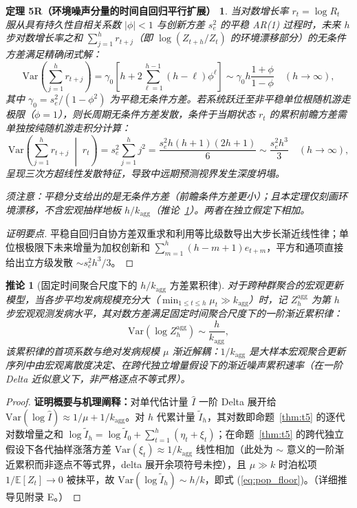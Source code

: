\documentclass[10pt,a4paper]{article}
\theoremstyle{plain}
\newtheorem*{theorem5R}{定理 5R（环境噪声分量的时间自回归平行扩展）}
\newtheorem{corollary}{推论}
\theoremstyle{definition}
\begin{document}
\begin{theorem5R}\label{thm:t5r}
当对数增长率 $r_t = \log R_t$ 服从具有持久性自相关系数 $|\phi| < 1$ 与创新方差 $s_e^2$ 的平稳 AR(1) 过程时，未来 $h$ 步对数增长率之和 $\sum_{j=1}^h r_{t+j}$（即 $\log(Z_{t+h}/Z_t)$ 的环境漂移部分）的无条件方差满足精确闭式解：
\begin{equation}
\text{Var}\left(\sum_{j=1}^h r_{t+j}\right) = \gamma_0 \left[ h + 2 \sum_{\ell=1}^{h-1} (h-\ell) \phi^\ell \right] \sim \gamma_0 h \frac{1+\phi}{1-\phi} \quad (h \to \infty),
\end{equation}
其中 $\gamma_0 = s_e^2/(1-\phi^2)$ 为平稳无条件方差。若系统跃迁至非平稳单位根随机游走极限（$\phi = 1$），则长周期无条件方差发散，条件于当期状态 $r_t$ 的累积前瞻方差需单独按纯随机游走积分计算：
\begin{equation}
\text{Var}\left(\sum_{j=1}^h r_{t+j} \;\middle|\; r_t\right) = s_e^2 \sum_{j=1}^h j^2 = \frac{s_e^2 h(h+1)(2h+1)}{6} \sim \frac{s_e^2 h^3}{3} \quad (h \to \infty),
\end{equation}
呈现三次方超线性发散特征，导致中远期预测视界发生深度坍塌。

须注意：平稳分支给出的是无条件方差（前瞻条件方差更小）；且本定理仅刻画环境漂移，不含宏观抽样地板 $h/k_{\text{agg}}$（推论~\ref{cor:pop_floor}）。两者在独立假定下相加。
\end{theorem5R}

\begin{proof}[证明要点]
平稳自回归自协方差双重求和利用等比级数导出大步长渐近线性律；单位根极限下未来增量为加权创新和 $\sum_{m=1}^h (h-m+1)e_{t+m}$，平方和通项直接给出立方级发散 $\sim s_e^2 h^3/3$。
\end{proof}

\begin{corollary}[固定时间聚合尺度下的 $h/k_{\text{agg}}$ 方差累积律]\label{cor:pop_floor}
对于跨种群聚合的宏观更新模型，当各步平均发病规模充分大（$\min_{1 \le t \le h} \mu_t \gg k_{\text{agg}}$）时，记 $Z_h^{\text{agg}}$ 为第 $h$ 步宏观观测发病水平，其对数方差满足固定时间聚合尺度下的一阶渐近累积律：
\begin{equation}
\text{Var}(\log Z_h^{\text{agg}}) \sim \frac{h}{k_{\text{agg}}},
\label{eq:pop_floor}
\end{equation}
该累积律的首项系数与绝对发病规模 $\mu$ 渐近解耦：$1/k_{\text{agg}}$ 是大样本宏观聚合更新序列中由宏观离散度决定、在跨代独立增量假设下的渐近噪声累积速率（在一阶 Delta 近似意义下，非严格逐点不等式界）。
\end{corollary}

\begin{proof}
\textbf{证明概要与机理阐释：}对单代估计量 $\hat{I}$ 一阶 Delta 展开给 $\text{Var}(\log\hat{I}) \approx 1/\mu + 1/k_{\text{agg}}$。对 $h$ 代累计量 $\tilde{I}_h$，其对数即命题~\ref{thm:t5} 的逐代对数增量之和 $\log\tilde{I}_h = \log \tilde{I}_0 + \sum_{t=1}^{h}(\eta_t + \xi_t)$；在命题~\ref{thm:t5} 的跨代独立假设下各代抽样涨落方差 $\text{Var}(\xi_t)\approx 1/k_{\text{agg}}$ 线性相加（此处为 $\sim$ 意义的一阶渐近累积而非逐点不等式界，delta 展开余项符号未控），且 $\mu \gg k$ 时泊松项 $1/\mathbb{E}[Z_t] \to 0$ 被抹平，故 $\text{Var}(\log\tilde{I}_h) \sim h/k$，即式 (\ref{eq:pop_floor})。（详细推导见附录 E。）
\end{proof}
\end{document}
